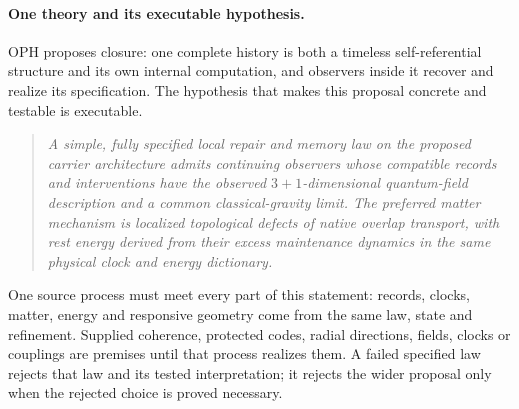 \paragraph{One theory and its executable hypothesis.}
OPH proposes closure: one complete history is both a timeless
self-referential structure and its own internal computation, and observers
inside it recover and realize its specification. The hypothesis that makes
this proposal concrete and testable is executable.

\begin{quote}\itshape
A simple, fully specified local repair and memory law on the proposed
carrier architecture admits continuing observers whose compatible records
and interventions have the observed \(3+1\)-dimensional quantum-field
description and a common classical-gravity limit. The preferred matter
mechanism is localized topological defects of native overlap transport,
with rest energy derived from their excess maintenance dynamics in the same
physical clock and energy dictionary.
\end{quote}

One source process must meet every part of this statement: records, clocks,
matter, energy and responsive geometry come from the same law, state and
refinement. Supplied coherence, protected codes, radial directions, fields,
clocks or couplings are premises until that process realizes them. A failed
specified law rejects that law and its tested interpretation; it rejects the
wider proposal only when the rejected choice is proved necessary.

